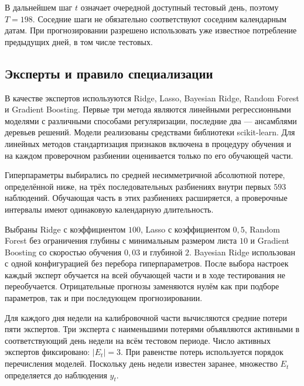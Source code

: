 \documentclass[a4paper,12pt]{article}
\theoremstyle{plain}
\theoremstyle{definition}
\theoremstyle{remark}
\numberwithin{equation}{section}
\begin{document}
В дальнейшем шаг $t$ означает очередной доступный тестовый день, поэтому $T=198$. Соседние шаги не обязательно соответствуют соседним календарным датам. При прогнозировании разрешено использовать уже известное потребление предыдущих дней, в том числе тестовых.

\FloatBarrier
\subsection{Эксперты и правило специализации}

В качестве экспертов используются Ridge, Lasso, Bayesian Ridge, Random Forest и Gradient Boosting. Первые три метода являются линейными регрессионными моделями с различными способами регуляризации, последние два --- ансамблями деревьев решений. Модели реализованы средствами библиотеки scikit-learn. Для линейных методов стандартизация признаков включена в процедуру обучения и на каждом проверочном разбиении оценивается только по его обучающей части.

Гиперпараметры выбирались по средней несимметричной абсолютной потере, определённой ниже, на трёх последовательных разбиениях внутри первых $593$ наблюдений. Обучающая часть в этих разбиениях расширяется, а проверочные интервалы имеют одинаковую календарную длительность. %

Выбраны Ridge с коэффициентом $100$, Lasso с коэффициентом $0{,}5$, Random Forest без ограничения глубины с минимальным размером листа $10$ и Gradient Boosting со скоростью обучения $0{,}03$ и глубиной $2$. Bayesian Ridge использован с одной конфигурацией без перебора гиперпараметров. После выбора настроек каждый эксперт обучается на всей обучающей части и в ходе тестирования не переобучается. Отрицательные прогнозы заменяются нулём как при подборе параметров, так и при последующем прогнозировании.

Для каждого дня недели на калибровочной части вычисляются средние потери пяти экспертов. Три эксперта с наименьшими потерями объявляются активными в соответствующий день недели на всём тестовом периоде. Число активных экспертов фиксировано: $|E_t|=3$. При равенстве потерь используется порядок перечисления моделей. Поскольку день недели известен заранее, множество $E_t$ определяется до наблюдения $y_t$.
\end{document}
